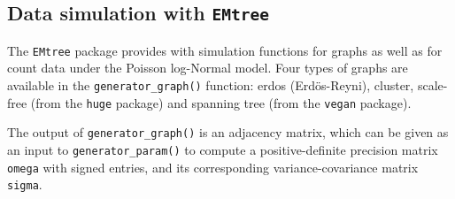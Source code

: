 

%
%
%


\subsection{\texorpdfstring{Data simulation with
\texttt{EMtree}}{Data simulation with EMtree}}\label{data-simulation-with-emtree}

The \texttt{EMtree} package provides with simulation functions for
graphs as well as for count data under the Poisson log-Normal model.
Four types of graphs are available in the \texttt{generator\_graph()}
function: erdos (Erdös-Reyni), cluster, scale-free (from the
\texttt{huge} package) and spanning tree (from the \texttt{vegan}
package).

\begin{Shaded}
\begin{Highlighting}[]
\NormalTok{,}\NormalTok{, }\NormalTok{)}
\NormalTok{,}\NormalTok{)}
\NormalTok{)}
\NormalTok{)}
\end{Highlighting}
\end{Shaded}

The output of \texttt{generator\_graph()} is an adjacency matrix, which
can be given as an input to \texttt{generator\_param()} to compute a
positive-definite precision matrix \texttt{omega} with signed entries,
and its corresponding variance-covariance matrix \texttt{sigma}.

\begin{Shaded}
\begin{Highlighting}[]
 \NormalTok{)}
\end{Highlighting}
\end{Shaded}

